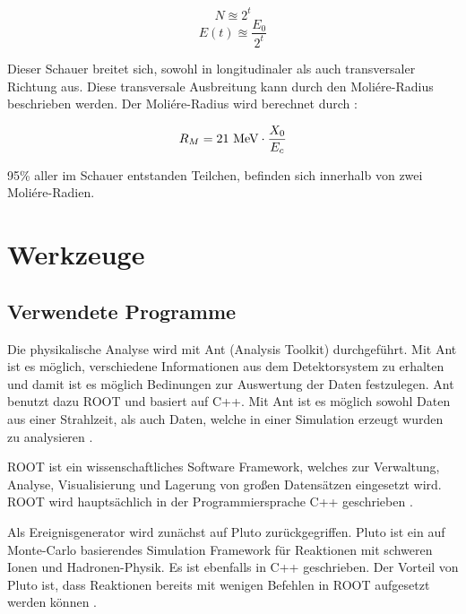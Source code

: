\documentclass[a4paper,11pt,oneside,final,german,openbib,pdftex]{scrbook}
\begin{document}
{\begin{equation}
N\approxeq 2^t
\end{equation}
\begin{equation}
E(t) \approxeq \frac{E_0}{2^t}
\end{equation}

Dieser Schauer breitet sich, sowohl in longitudinaler als auch transversaler Richtung aus. Diese transversale Ausbreitung kann durch den Moli\'ere-Radius beschrieben werden. 
Der Moli\'ere-Radius wird berechnet durch \cite{Leo87}:

\begin{equation}
R_M = 21 \textnormal{ MeV}\cdot \frac{X_0}{E_c}
\end{equation}

95\% aller im Schauer entstanden Teilchen, befinden sich innerhalb von zwei Moli\'ere-Radien. 

















\chapter{Werkzeuge}
\label{chap:Wergzeuge}
\section{Verwendete Programme}

Die physikalische Analyse wird mit Ant (Analysis Toolkit) durchgef\"uhrt. Mit Ant ist es m\"oglich, verschiedene Informationen aus dem Detektorsystem zu erhalten und damit ist es m\"oglich Bedinungen zur Auswertung der Daten festzulegen. Ant benutzt dazu ROOT und basiert auf C++. Mit Ant ist es m\"oglich sowohl Daten aus einer Strahlzeit, als auch Daten, welche in einer Simulation erzeugt wurden zu analysieren \cite{Ant17}.

ROOT ist ein wissenschaftliches Software Framework, welches zur Verwaltung, Analyse, Visualisierung und Lagerung von gro{\ss}en Datens\"atzen eingesetzt wird. ROOT wird haupts\"achlich in der Programmiersprache C++ geschrieben \cite{Ce97}.

Als Ereignisgenerator wird zun\"achst auf Pluto zur\"uckgegriffen. Pluto ist ein auf Monte-Carlo basierendes Simulation Framework f\"ur Reaktionen mit schweren Ionen und Hadronen-Physik. Es ist ebenfalls in C++ geschrieben. Der Vorteil von Pluto ist, dass Reaktionen bereits mit wenigen Befehlen in ROOT aufgesetzt werden k\"onnen \cite{Pl07}. 

}
\end{document}
